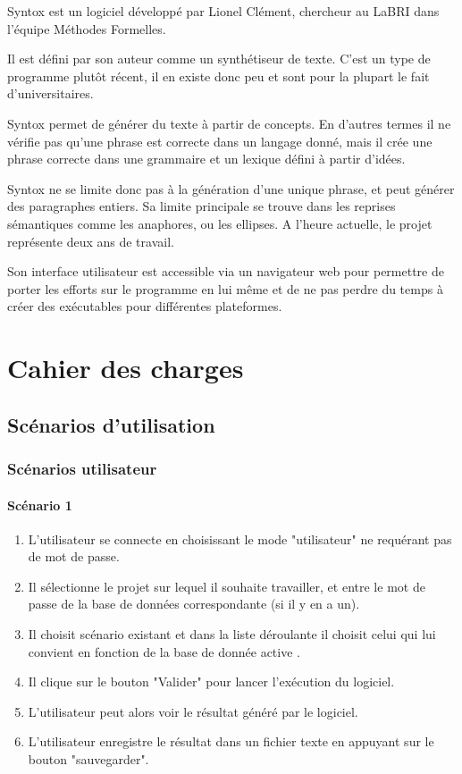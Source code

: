\documentclass[12pt]{report}
\begin{document}

Syntox \cite{Clem12} est un logiciel développé par Lionel Clément, chercheur au LaBRI dans l'équipe Méthodes Formelles.

Il est défini par son auteur comme un synthétiseur de texte. C'est un type de programme plutôt récent, il en existe donc peu et sont pour la plupart le fait d'universitaires.

Syntox permet de générer du texte à partir de concepts. En d'autres termes il ne vérifie pas qu'une phrase est correcte dans un langage donné, mais il crée une phrase correcte dans une grammaire et un lexique défini à partir d'idées.

Syntox ne se limite donc pas à la génération d'une unique phrase, et peut générer des paragraphes entiers. Sa limite principale se trouve dans les reprises sémantiques comme les anaphores, ou les ellipses.
A l'heure actuelle, le projet représente deux ans de travail.

Son interface utilisateur est accessible via un navigateur web pour permettre de porter les efforts sur le programme en lui même et de ne pas perdre du temps à créer des exécutables pour différentes plateformes. 


\chapter{Cahier des charges}


\section{Scénarios d'utilisation}

\subsection{Scénarios utilisateur}

\subsubsection{Scénario 1}
	\begin{enumerate}
	\item L'utilisateur se connecte en choisissant le mode "utilisateur" ne requérant pas de mot de passe.
			\item Il sélectionne le projet sur lequel il souhaite travailler, et entre le mot de passe de la base de données correspondante (si il y en a un).
            \item Il choisit scénario existant et dans la liste déroulante il choisit celui qui lui convient en fonction de la base de donnée active .
            \item Il clique sur le bouton "Valider" pour lancer l'exécution du logiciel.
            \item L'utilisateur peut alors voir le résultat généré par le logiciel.
            \item L'utilisateur enregistre le résultat dans un fichier texte en appuyant sur le bouton "sauvegarder".
            \end{enumerate}
\end{document}
